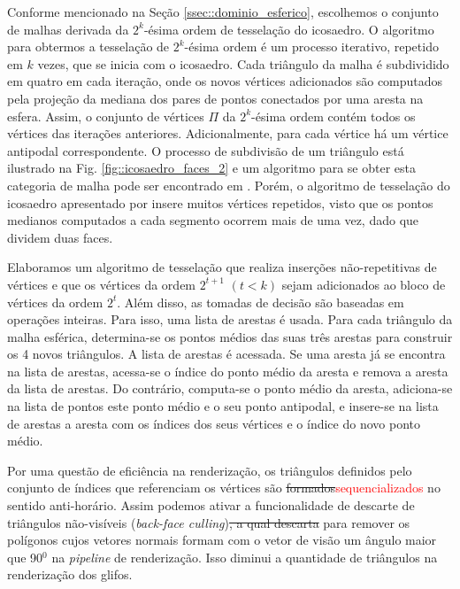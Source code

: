 
Conforme mencionado na Seção \ref{ssec::dominio_esferico}, escolhemos o conjunto de malhas derivada da $2^k$-ésima ordem de tesselação do icosaedro. O algoritmo para obtermos a tesselação de $2^k$-ésima ordem é um processo iterativo, repetido em $k$ vezes, que se inicia com o icosaedro. Cada triângulo da malha é subdividido em quatro em cada iteração, onde os novos vértices adicionados são computados pela projeção da mediana dos pares de pontos conectados por uma aresta na esfera. Assim, o conjunto de vértices $\Pi$ da $2^k$-ésima ordem contém todos os vértices das iterações anteriores. Adicionalmente, para cada vértice há um vértice antipodal correspondente. O processo de subdivisão de um triângulo está ilustrado na Fig. \ref{fig::icosaedro_faces_2} e um algoritmo para se obter esta categoria de malha pode ser encontrado em . Porém, o algoritmo de tesselação do icosaedro apresentado por  insere muitos vértices repetidos, visto que os pontos medianos computados a cada segmento ocorrem mais de uma vez, dado que dividem duas faces.


Elaboramos um algoritmo de tesselação que realiza inserções não-repetitivas de vértices e que os vértices da ordem $2^{t+1}$ $(t < k)$ sejam adicionados ao bloco de vértices da ordem $2^t$. Além disso, as tomadas de decisão são baseadas em operações inteiras. Para isso, uma lista de arestas é usada. Para cada triângulo da malha esférica, determina-se os pontos médios das suas três arestas para construir os 4 novos triângulos. A lista de arestas é acessada. Se uma aresta já se encontra na lista de arestas, acessa-se o índice do ponto médio da aresta e remova a aresta da lista de arestas. Do contrário, computa-se o ponto médio da aresta, adiciona-se na lista de pontos este ponto médio e o seu ponto antipodal, e insere-se na lista de arestas a aresta com os índices dos seus vértices e o índice do novo ponto médio.

Por uma questão de eficiência na renderização, os triângulos definidos pelo conjunto de índices que referenciam os vértices são \sout{formados}\textcolor{red}{sequencializados} no sentido anti-horário. Assim podemos ativar a funcionalidade de descarte de triângulos não-visíveis (\textit{back-face culling})\sout{, a qual descarta} para remover os polígonos cujos vetores normais formam com o vetor de visão um ângulo maior que 90$^0$ na \textit{pipeline} de renderização. Isso diminui a quantidade de triângulos na renderização dos glifos.

